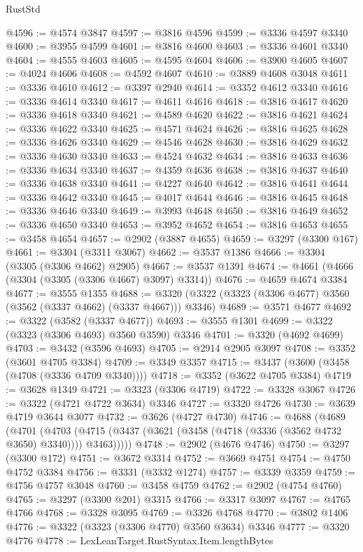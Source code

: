 \begin{lexlean}{RustStd}
\begin{coremodule}
@4596 := @4574 @3847
@4597 := @3816 @4596
@4599 := @3336 @4597 @3340
@4600 := @3955 @4599
@4601 := @3816 @4600
@4603 := @3336 @4601 @3340
@4604 := @4555 @4603
@4605 := @4595 @4604
@4606 := @3900 @4605
@4607 := @4024 @4606
@4608 := @4592 @4607
@4610 := @3889 @4608 @3048
@4611 := @3336 @4610
@4612 := @3397 @2940
@4614 := @3352 @4612 @3340
@4616 := @3336 @4614 @3340
@4617 := @4611 @4616
@4618 := @3816 @4617
@4620 := @3336 @4618 @3340
@4621 := @4589 @4620
@4622 := @3816 @4621
@4624 := @3336 @4622 @3340
@4625 := @4571 @4624
@4626 := @3816 @4625
@4628 := @3336 @4626 @3340
@4629 := @4546 @4628
@4630 := @3816 @4629
@4632 := @3336 @4630 @3340
@4633 := @4524 @4632
@4634 := @3816 @4633
@4636 := @3336 @4634 @3340
@4637 := @4359 @4636
@4638 := @3816 @4637
@4640 := @3336 @4638 @3340
@4641 := @4227 @4640
@4642 := @3816 @4641
@4644 := @3336 @4642 @3340
@4645 := @4017 @4644
@4646 := @3816 @4645
@4648 := @3336 @4646 @3340
@4649 := @3993 @4648
@4650 := @3816 @4649
@4652 := @3336 @4650 @3340
@4653 := @3952 @4652
@4654 := @3816 @4653
@4655 := @3458 @4654
@4657 := @2902 (@3887 @4655)
@4659 := @3297 (@3300 @167)
@4661 := @3304 (@3311 @3067)
@4662 := @3537 @1386
@4666 := @3304 (@3305 (@3306 @4662) @2905)
@4667 := @3537 @1391
@4674 := @4661 (@4666 (@3304 (@3305 (@3306 @4667) @3097) @3314))
@4676 := @4659 @4674 @3384
@4677 := @3555 @1355
@4688 := @3320 (@3322 (@3323 (@3306 @4677) @3560 (@3562 (@3337 @4662) (@3337 @4667))) @3346)
@4689 := @3571 @4677
@4692 := @3322 (@3582 (@3337 @4677))
@4693 := @3555 @1301
@4699 := @3322 (@3323 (@3306 @4693) @3560 @3590) @3346
@4701 := @3320 (@4692 @4699)
@4703 := @3432 (@3596 @4693)
@4705 := @2914 @2905 @3097
@4708 := @3352 (@3601 @4705 @3384)
@4709 := @3349 @3357
@4715 := @3437 (@3600 (@3458 (@4708 (@3336 @4709 @3340))))
@4718 := @3352 (@3622 @4705 @3384)
@4719 := @3628 @1349
@4721 := @3323 (@3306 @4719)
@4722 := @3328 @3067
@4726 := @3322 (@4721 @4722 @3634) @3346
@4727 := @3320 @4726
@4730 := @3639 @4719 @3644 @3077
@4732 := @3626 (@4727 @4730)
@4746 := @4688
    (@4689
      (@4701
        (@4703 (@4715 (@3437 (@3621 (@3458 (@4718 (@3336 (@3562 @4732 @3650) @3340)))) @3463)))))
@4748 := @2902 (@4676 @4746)
@4750 := @3297 (@3300 @172)
@4751 := @3672 @3314
@4752 := @3669 @4751
@4754 := @4750 @4752 @3384
@4756 := @3331 (@3332 @1274)
@4757 := @3339 @3359
@4759 := @4756 @4757 @3048
@4760 := @3458 @4759
@4762 := @2902 (@4754 @4760)
@4765 := @3297 (@3300 @201) @3315
@4766 := @3317 @3097
@4767 := @4765 @4766
@4768 := @3328 @3095
@4769 := @3326 @4768
@4770 := @3802 @1406
@4776 := @3322 (@3323 (@3306 @4770) @3560 @3634) @3346
@4777 := @3320 @4776
@4778 := LexLeanTarget.RustSyntax.Item.lengthBytes

\end{coremodule}
\end{lexlean}

